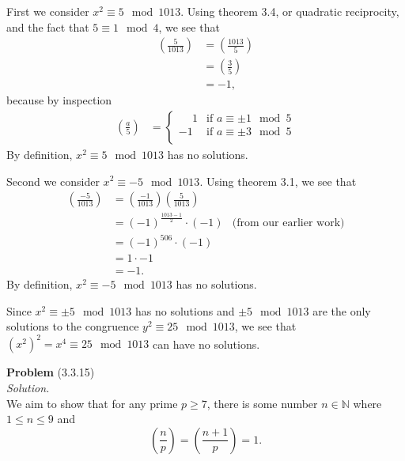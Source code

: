 \documentclass[12 pt]{amsart}
\begin{document}
  First we consider $x^2 \equiv 5 \mod 1013$.
  Using theorem 3.4, or quadratic reciprocity, and the
  fact that $5 \equiv 1 \mod 4$, we see that 
  \begin{align*}
    \left( \frac{5}{1013} \right)
    &=
      \left( \frac{1013}{5} \right) \\
    &=
      \left( \frac{3}{5} \right) \\
    &=
      -1,
  \end{align*}
  because by inspection
  \begin{align*}
    \left( \frac{a}{5} \right)
    &=
      \begin{cases}
        \phantom{-}1 & \text{if $a \equiv \pm 1 \mod 5$} \\
        -1 & \text{if $a \equiv \pm 3 \mod 5$} \\
      \end{cases}
  \end{align*}
  By definition, $x^2 \equiv 5 \mod 1013$ has no solutions.

  Second we consider $x^2 \equiv -5 \mod 1013$.
  Using theorem 3.1, we see that
  \begin{align*}
    \left( \frac{-5}{1013} \right)
    &=
      \left( \frac{-1}{1013} \right)
      \left( \frac{5}{1013} \right) \\
    &=
      (-1)^{\frac{1013-1}{2}} \cdot (-1) & \text{(from our earlier work)} \\
    &=
      (-1)^{506} \cdot (-1) \\
    &=
      1 \cdot -1 \\
    &= 
      -1.
  \end{align*}
  By definition, $x^2 \equiv -5 \mod 1013$ has no solutions.

  Since $x^2 \equiv \pm 5 \mod 1013$ has no solutions and 
  $\pm 5 \mod 1013$ are the only solutions to the congruence
  $y^2 \equiv 25 \mod 1013$, 
  we see that
  $\left( x^2 \right)^2 = x^4 \equiv 25 \mod 1013$ 
  can have no solutions.
\vfill
\newpage



\phantom{\quad} \vfill
\noindent
\textbf{Problem} (3.3.15) \\[4ex]
\emph{Solution.} \\[2ex]
  We aim to show that for any prime $p \geq 7$, there
  is some number $n \in \mathbb{N}$ where
  $1 \leq n \leq 9$ and 
  \begin{equation}
    \label{eq:3.3.15.1}
    \left( \frac{n}{p} \right) 
    = 
    \left( \frac{n+1}{p} \right) 
    = 
    1.
  \end{equation}
\end{document}
